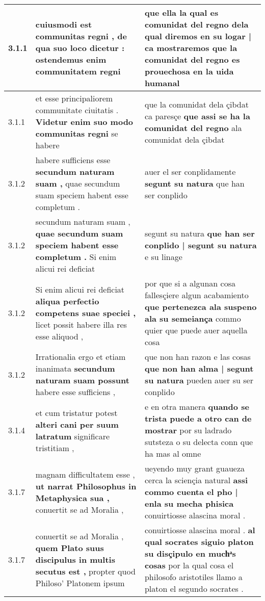 \begin{tabular}{|p{1cm}|p{6.5cm}|p{6.5cm}|}
3.1.1 & cuiusmodi est communitas regni , \textbf{ de qua suo loco dicetur : } ostendemus enim communitatem regni & que ella la qual es comunidat del regno \textbf{ dela qual diremos en su logar | ca mostraremos } que la comunidat del regno es prouechosa en la uida humanal \\\hline
3.1.1 & et esse principaliorem communitate ciuitatis . \textbf{ Videtur enim suo modo communitas regni } se habere & que la comunidat dela çibdat ca paresçe \textbf{ que assi se ha la comunidat del regno } ala comunidat dela çibdat \\\hline
3.1.2 & habere sufficiens esse \textbf{ secundum naturam suam , } quae secundum suam speciem habent esse completum . & auer el ser conplidamente \textbf{ segunt su natura } que han ser conplido \\\hline
3.1.2 & secundum naturam suam , \textbf{ quae secundum suam speciem habent esse completum . } Si enim alicui rei deficiat & segunt su natura \textbf{ que han ser conplido | segunt su natura } e su linage \\\hline
3.1.2 & Si enim alicui rei deficiat \textbf{ aliqua perfectio competens suae speciei , } licet possit habere illa res esse aliquod , & por que si a algunan cosa fallesçiere algun acabamiento \textbf{ que pertenezca ala suspeno ala su semeiança } commo quier que puede auer aquella cosa \\\hline
3.1.2 & Irrationalia ergo et etiam inanimata \textbf{ secundum naturam suam possunt } habere esse sufficiens , & que non han razon e las cosas \textbf{ que non han alma | segunt su natura } pueden auer su ser conplido \\\hline
3.1.4 & et cum tristatur potest \textbf{ alteri cani per suum latratum } significare tristitiam , & e en otra manera \textbf{ quando se trista puede a otro can de mostrar } por su ladrado sutsteza o su delecta conn que ha mas al omne \\\hline
3.1.7 & magnam difficultatem esse , \textbf{ ut narrat Philosophus in Metaphysica sua , } conuertit se ad Moralia , & ueyendo muy grant guaueza cerca la sciençia natural \textbf{ assi commo cuenta el pho | enla su mecha phisica } conuirtiosse alascina moral . \\\hline
3.1.7 & conuertit se ad Moralia , \textbf{ quem Plato suus discipulus in multis secutus est , } propter quod Philoso’ Platonem ipsum & conuirtiosse alascina moral . \textbf{ al qual socrates siguio platon su disçipulo en muchͣs cosas } por la qual cosa el philosofo aristotiles llamo a platon el segundo socrates . \\\hline

\end{tabular}
